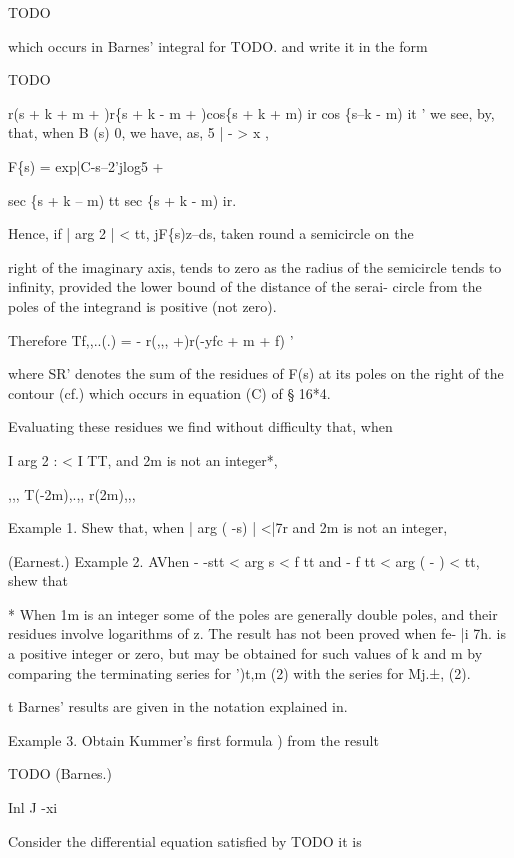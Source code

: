 TODO

which occurs in Barnes' integral for TODO. and write it in the form

TODO

r(s + k + m + )r\{s + k - m + )cos\{s + k + m) ir cos \{s--k - m)
it ' we see, by, that, when B (s)  0, we have, as, 5 | - > x
,

F\{s) = exp|C-s--2'jlog5 +

sec \{s + k -- m) tt sec \{s + k - m) ir.

Hence, if | arg 2 | <  tt, jF\{s)z--ds, taken round a semicircle
on the

right of the imaginary axis, tends to zero as the radius of the
semicircle tends to infinity, provided the lower bound of the distance
of the serai- circle from the poles of the integrand is positive (not
zero).

Therefore Tf,,..(.) = - r(,,, +)r(-yfc + m + f) '

where SR' denotes the sum of the residues of F(s) at its poles on the
right of the contour (cf.) which occurs in equation (C) of §
16*4.

Evaluating these residues we find without difficulty that, when

I arg 2 : < I TT, and 2m is not an integer*,

,,, T(-2m),.,, r(2m),,,

Example 1. Shew that, when | arg ( -s) | <|7r and 2m is not an
integer,

(Earnest.) Example 2. AVhen - -stt < arg s < f tt and - f tt < arg ( -
) < tt, shew that

* When 1m is an integer some of the poles are generally double poles,
and their residues involve logarithms of z. The result has not been
proved when fe- |i 7h. is a positive integer or zero, but may be
obtained for such values of k and m by comparing the terminating
series for ')t,m (2) with the series for Mj.±, (2).

t Barnes' results are given in the notation explained in.

%
%

Example 3. Obtain Kummer's first formula ) from the result

TODO (Barnes.)

Inl J -xi


Consider the differential equation satisfied by TODO it is

